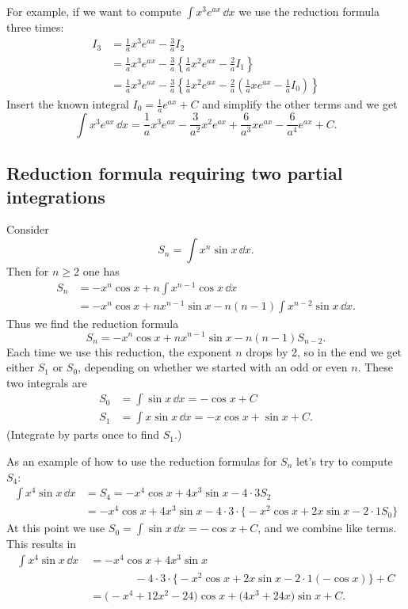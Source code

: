 For example, if we want to compute $\int x^3 e^{ax}\,\dd x$ we use the reduction
formula three times:
\begin{align*}
  I_3
  &= \frac 1a x^3 e^{ax} - \frac 3a I_2 \\
  &=\frac 1a x^3 e^{ax}
  - \frac 3a \left\{\frac 1a x^2 e^{ax} - \frac 2a I_1\right\} \\
  &=\frac 1a x^3 e^{ax} - \frac 3a \left\{\frac 1a x^2 e^{ax} - \frac 2a
    \left(\frac 1a x e^{ax} - \frac 1a I_0 \right)\right\}
\end{align*}
Insert the known integral $I_0= \frac1a e^{ax} +C$ and simplify the other terms
and we get
\[
\int x^3e^{ax}\,\dd x = \frac 1a x^3 e^{ax} -\frac 3{a^2} x^2 e^{ax} +\frac
6{a^3} x e^{ax} -\frac 6{a^4} e^{ax}+C.
\]


\subsection{Reduction formula requiring two partial integrations} %
Consider
\[
S_n = \int x^n \sin x\,\dd x.
\]
Then for $n\geq 2$ one has
\begin{align*}
  S_n
  &= -x^n\cos x +n\int x^{n-1}\cos x\,\dd x \\
  &= -x^n\cos x +n x^{n-1}\sin x - n (n-1)\int x^{n-2}\sin x\,\dd x.
\end{align*}
Thus we find the reduction formula
\[
S_n = -x^n\cos x +n x^{n-1}\sin x - n (n-1)S_{n-2}.
\]
Each time we use this reduction, the exponent $n$ drops by 2, so in the end we
get either $S_1$ or $S_0$, depending on whether we started with an odd or even
$n$.  These two integrals are
\begin{align*}
  S_0 &= \int \sin x\,\dd x = -\cos x + C \\
  S_1 &= \int x\sin x\, \dd x = -x\cos x+\sin x +C.
\end{align*}
(Integrate by parts once to find $S_1$.)

As an example of how to use the reduction formulas for $S_n$ let's try to
compute $S_4$:
\begin{align*}
  \int x^4\sin x \, \dd x
  &= S_4 = -x^4 \cos x + 4x^3 \sin x - 4\cdot 3 S_2 \\
  &= -x^4 \cos x + 4x^3 \sin x - 4\cdot 3 \cdot \bigl\{-x^2\cos x +2x\sin x -
  2\cdot1 S_0\bigr\}
\end{align*}
At this point we use $S_0 = \int \sin x\, \dd x = -\cos x+C$, and we combine
like terms.  This results in
\begin{align*}
  \int x^4\sin x \, \dd x\
  &= -x^4 \cos x + 4x^3 \sin x \\
  & \qquad \qquad- 4\cdot 3 \cdot \bigl\{-x^2\cos x +2x\sin x - 2\cdot1 (-\cos x)\bigr\} + C\\
  & = \bigl(-x^4 +12x^2-24\bigr) \cos x + \bigl(4x^3+24x \bigr)\sin x +C.
\end{align*}

